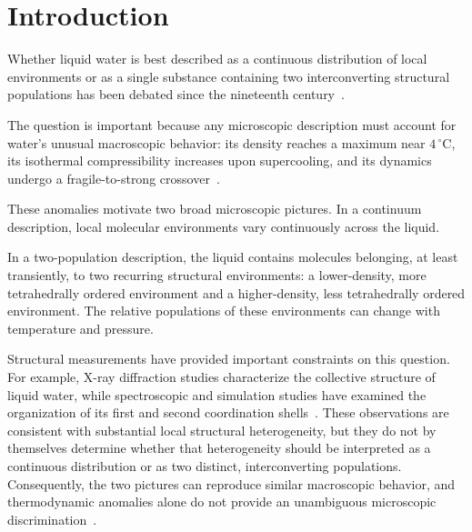 \documentclass[aps, amsmath,amssymb, reprint, twocolumn, superscriptaddress]{revtex4-2}
\begin{document}
\maketitle
\section{Introduction}

Whether liquid water is best described as a continuous distribution of local environments or as a single substance containing two interconverting structural populations has been debated since the nineteenth century~\cite{rontgen-1892}.

The question is important because any microscopic description must account for water's unusual macroscopic behavior: its density reaches a maximum near $4\,^{\circ}$C, its isothermal compressibility increases upon supercooling, and its dynamics undergo a fragile-to-strong crossover~\cite{gallo_water_2016}.

These anomalies motivate two broad microscopic pictures. In a continuum description, local molecular environments vary continuously across the liquid.

In a two-population description, the liquid contains molecules belonging, at least transiently, to two recurring structural environments: a lower-density, more tetrahedrally ordered environment and a higher-density, less tetrahedrally ordered environment. The relative populations of these environments can change with temperature and pressure.

Structural measurements have provided important constraints on this question. For example, X-ray diffraction studies characterize the collective structure of liquid water, while spectroscopic and simulation studies have examined the organization of its first and second coordination shells~\cite{narten_observed_1969,wernet-2004,huang-2009}. These observations are consistent with substantial local structural heterogeneity, but they do not by themselves determine whether that heterogeneity should be interpreted as a continuous distribution or as two distinct, interconverting populations. Consequently, the two pictures can reproduce similar macroscopic behavior, and thermodynamic anomalies alone do not provide an unambiguous microscopic discrimination~\cite{russo_understanding_2014,handle_supercooled_2017}.
\end{document}
